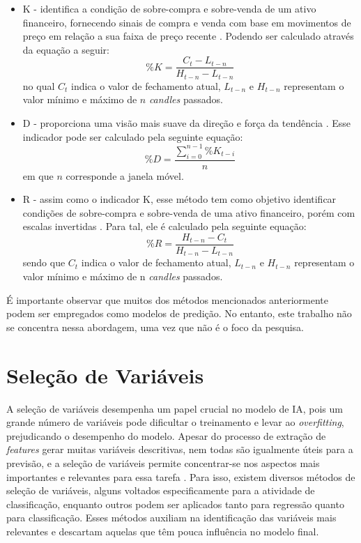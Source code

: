 \begin{itemize}
    \item \ac{K} - identifica a condição de sobre-compra e sobre-venda de um ativo financeiro, fornecendo sinais de compra e venda com base em movimentos de preço em relação a sua faixa de preço recente \cite{Leonardo_Comparative, C_Veeramani_Exploration}. Podendo ser calculado através da equação a seguir: 
    \begin{equation}
        \label{eq:K}
        \%K = \frac{C_t-L_{t-n}}{H_{t-n}-L_{t-n}}
    \end{equation}
    no qual $C_t$ indica o valor de fechamento atual, $L_{t-n}$ e $H_{t-n}$ representam o valor mínimo e máximo de $n$ \textit{candles} passados. 
    
    \item \ac{D} - proporciona uma visão mais suave da direção e força da tendência \cite{pabucccu2023forecasting}. Esse indicador pode ser calculado pela seguinte equação:
    \begin{equation}
        \label{eq:D}
        \%D = \frac{\sum_{i=0}^{n-1} \%K_{t-i}}{n}
    \end{equation}
    em que $n$ corresponde a janela móvel.
    
    \item \ac{R} - assim como o indicador \ac{K}, esse método tem como objetivo identificar condições de sobre-compra e sobre-venda de uma ativo financeiro, porém com escalas invertidas \cite{lee2021exploring}. Para tal, ele é calculado pela seguinte equação: 
    \begin{equation}
        \label{eq:R} 
        \%R = \frac{H_{t-n}-C_t}{H_{t-n}-L_{t-n}}
    \end{equation}
    sendo que $C_t$ indica o valor de fechamento atual, $L_{t-n}$ e $H_{t-n}$ representam o valor mínimo e máximo de n \textit{candles} passados. 
\end{itemize}

É importante observar que muitos dos métodos mencionados anteriormente podem ser empregados como modelos de predição. No entanto, este trabalho não se concentra nessa abordagem, uma vez que não é o foco da pesquisa.

\section{Seleção de Variáveis}
\label{subsec:selecao_variaveis}
A seleção de variáveis desempenha um papel crucial no modelo de IA, pois um grande número de variáveis pode dificultar o treinamento e levar ao \textit{overfitting}, prejudicando o desempenho do modelo. Apesar do processo de extração de \textit{features} gerar muitas variáveis descritivas, nem todas são igualmente úteis para a previsão, e a seleção de variáveis permite concentrar-se nos aspectos mais importantes e relevantes para essa tarefa \cite{meyer2019importance}.
Para isso, existem diversos métodos de seleção de variáveis, alguns voltados especificamente para a atividade de classificação, enquanto outros podem ser aplicados tanto para regressão quanto para classificação. Esses métodos auxiliam na identificação das variáveis mais relevantes e descartam aquelas que têm pouca influência no modelo final. 

